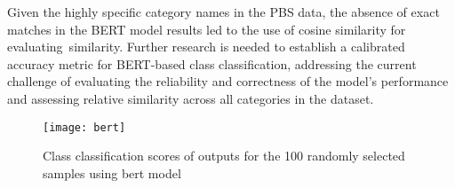Given the highly specific category names in the PBS data, the absence of exact matches in the BERT model results led to the use of cosine similarity for evaluating similarity. Further research is needed to establish a calibrated accuracy metric for BERT-based class classification, addressing the current challenge of evaluating the reliability and correctness of the model's performance and assessing relative similarity across all categories in the dataset.

\begin{figure}[H]
	\centering
	\texttt{[image: bert]}
	\caption{Class classification scores of outputs for the 100 randomly selected samples using bert model}
	\label{fig:results-bert}
\end{figure}